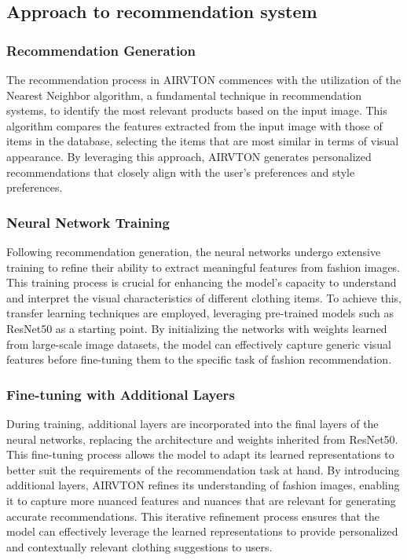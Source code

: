     \subsection{Approach to recommendation system}

	\subsubsection{Recommendation Generation}

    The recommendation process in AIRVTON commences with the utilization of the Nearest Neighbor algorithm, a fundamental technique in recommendation systems, to identify the most relevant products based on the input image. This algorithm compares the features extracted from the input image with those of items in the database, selecting the items that are most similar in terms of visual appearance. By leveraging this approach, AIRVTON generates personalized recommendations that closely align with the user's preferences and style preferences.

    \subsubsection{Neural Network Training}

    Following recommendation generation, the neural networks undergo extensive training to refine their ability to extract meaningful features from fashion images. This training process is crucial for enhancing the model's capacity to understand and interpret the visual characteristics of different clothing items. To achieve this, transfer learning techniques are employed, leveraging pre-trained models such as ResNet50 as a starting point. By initializing the networks with weights learned from large-scale image datasets, the model can effectively capture generic visual features before fine-tuning them to the specific task of fashion recommendation.

    \subsubsection{Fine-tuning with Additional Layers}

    During training, additional layers are incorporated into the final layers of the neural networks, replacing the architecture and weights inherited from ResNet50. This fine-tuning process allows the model to adapt its learned representations to better suit the requirements of the recommendation task at hand. By introducing additional layers, AIRVTON refines its understanding of fashion images, enabling it to capture more nuanced features and nuances that are relevant for generating accurate recommendations. This iterative refinement process ensures that the model can effectively leverage the learned representations to provide personalized and contextually relevant clothing suggestions to users.

